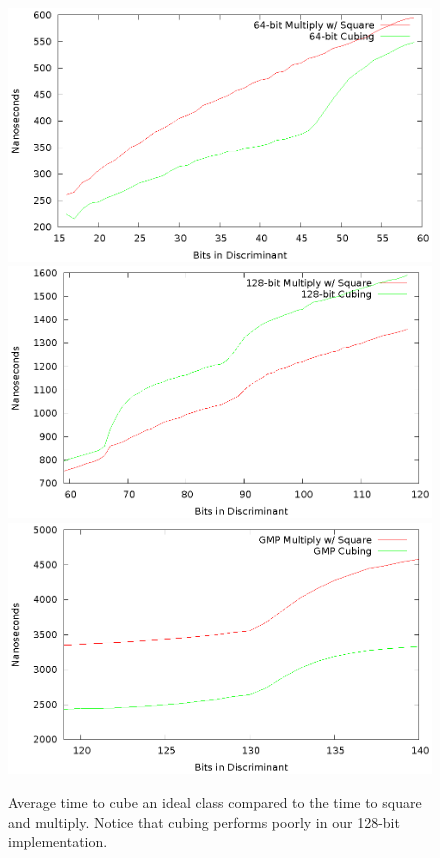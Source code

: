 \documentclass{ucalgthes1}
\theoremstyle{definition}
\begin{document}
\begin{figure}[H]
\centering
\includegraphics[scale=0.9]{cube-vs-64}
\includegraphics[scale=0.9]{cube-vs-128}
\includegraphics[scale=0.9]{cube-vs-mpz}
\caption{Average time to cube an ideal class compared to the time to square and multiply.  Notice that cubing performs poorly in our 128-bit implementation.}
\label{fig:cubingVsSquareAndMultiply}
\end{figure}
\end{document}
